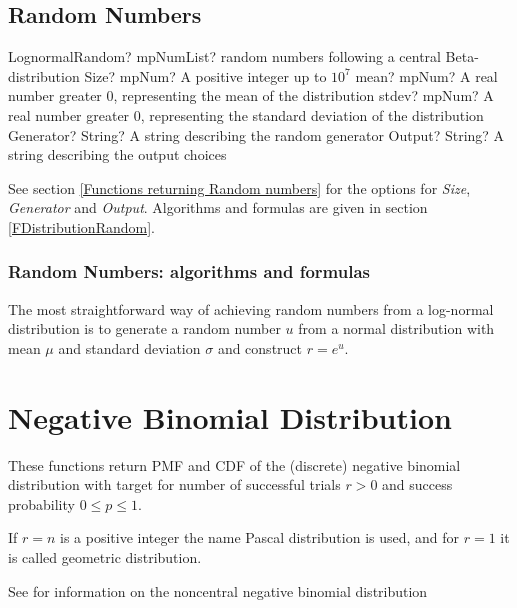 \subsection{Random Numbers}
\label{LognormalDistributionRandom}


\begin{mpFunctionsExtract}
	\mpFunctionFiveNotImplemented
	{LognormalRandom? mpNumList? random numbers following a central Beta-distribution}
	{Size? mpNum? A positive integer up to $10^7$}
	{mean? mpNum? A real number greater 0, representing the mean of the distribution}
	{stdev? mpNum? A real number greater 0, representing the standard deviation of the distribution}
	{Generator? String? A string describing the random generator}
	{Output? String? A string describing the output choices}
\end{mpFunctionsExtract}

\vspace{0.3cm}

See section \ref{Functions returning Random numbers} for the options for  {\itshape\sffamily Size},  {\itshape\sffamily Generator} and {\itshape\sffamily Output}. Algorithms and formulas are given in section \ref{FDistributionRandom}.


\subsubsection{Random Numbers: algorithms and formulas}
The most straightforward way of achieving random numbers from a log-normal distribution is to generate a random number $u$ from a normal distribution with mean $\mu$ and standard deviation $\sigma$ and construct $r = e^u$.



\newpage
\section{Negative Binomial Distribution}
\label{NegativBinomialDistribution}

These functions return PMF and CDF of the (discrete) negative binomial distribution with target for number of successful trials $r > 0$ and success probability $0 \leq  p \leq 1$.

If $r = n$ is a positive integer the name Pascal distribution is used, and for $r = 1$ it is called geometric distribution.

See \cite{ong_non-central_1979} for information on the noncentral negative binomial distribution

